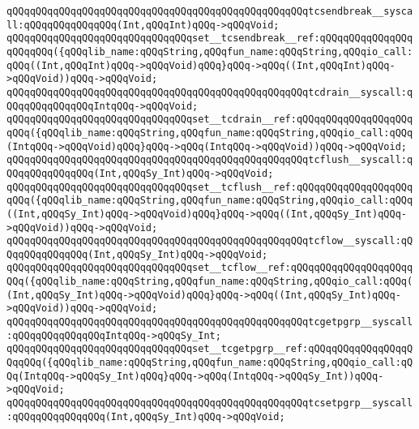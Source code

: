 \newline
\verb|qQQqqQQqqQQqqQQqqQQqqQQqqQQqqQQqqQQqqQQqqQQqqQQqqQQqtcsendbreak__syscall:qQQqqQQqqQQqqQQq(Int,qQQqInt)qQQq->qQQqVoid;|\newline
\verb|qQQqqQQqqQQqqQQqqQQqqQQqqQQqqQQqset__tcsendbreak__ref:qQQqqQQqqQQqqQQqqQQqqQQq({qQQqlib_name:qQQqString,qQQqfun_name:qQQqString,qQQqio_call:qQQq((Int,qQQqInt)qQQq->qQQqVoid)qQQq}qQQq->qQQq((Int,qQQqInt)qQQq->qQQqVoid))qQQq->qQQqVoid;|\newline
\newline
\verb|qQQqqQQqqQQqqQQqqQQqqQQqqQQqqQQqqQQqqQQqqQQqqQQqqQQqtcdrain__syscall:qQQqqQQqqQQqqQQqIntqQQq->qQQqVoid;|\newline
\verb|qQQqqQQqqQQqqQQqqQQqqQQqqQQqqQQqset__tcdrain__ref:qQQqqQQqqQQqqQQqqQQqqQQq({qQQqlib_name:qQQqString,qQQqfun_name:qQQqString,qQQqio_call:qQQq(IntqQQq->qQQqVoid)qQQq}qQQq->qQQq(IntqQQq->qQQqVoid))qQQq->qQQqVoid;|\newline
\newline
\verb|qQQqqQQqqQQqqQQqqQQqqQQqqQQqqQQqqQQqqQQqqQQqqQQqqQQqtcflush__syscall:qQQqqQQqqQQqqQQq(Int,qQQqSy_Int)qQQq->qQQqVoid;|\newline
\verb|qQQqqQQqqQQqqQQqqQQqqQQqqQQqqQQqset__tcflush__ref:qQQqqQQqqQQqqQQqqQQqqQQq({qQQqlib_name:qQQqString,qQQqfun_name:qQQqString,qQQqio_call:qQQq((Int,qQQqSy_Int)qQQq->qQQqVoid)qQQq}qQQq->qQQq((Int,qQQqSy_Int)qQQq->qQQqVoid))qQQq->qQQqVoid;|\newline
\newline
\verb|qQQqqQQqqQQqqQQqqQQqqQQqqQQqqQQqqQQqqQQqqQQqqQQqqQQqtcflow__syscall:qQQqqQQqqQQqqQQq(Int,qQQqSy_Int)qQQq->qQQqVoid;|\newline
\verb|qQQqqQQqqQQqqQQqqQQqqQQqqQQqqQQqset__tcflow__ref:qQQqqQQqqQQqqQQqqQQqqQQq({qQQqlib_name:qQQqString,qQQqfun_name:qQQqString,qQQqio_call:qQQq((Int,qQQqSy_Int)qQQq->qQQqVoid)qQQq}qQQq->qQQq((Int,qQQqSy_Int)qQQq->qQQqVoid))qQQq->qQQqVoid;|\newline
\newline
\verb|qQQqqQQqqQQqqQQqqQQqqQQqqQQqqQQqqQQqqQQqqQQqqQQqqQQqtcgetpgrp__syscall:qQQqqQQqqQQqqQQqIntqQQq->qQQqSy_Int;|\newline
\verb|qQQqqQQqqQQqqQQqqQQqqQQqqQQqqQQqset__tcgetpgrp__ref:qQQqqQQqqQQqqQQqqQQqqQQq({qQQqlib_name:qQQqString,qQQqfun_name:qQQqString,qQQqio_call:qQQq(IntqQQq->qQQqSy_Int)qQQq}qQQq->qQQq(IntqQQq->qQQqSy_Int))qQQq->qQQqVoid;|\newline
\newline
\verb|qQQqqQQqqQQqqQQqqQQqqQQqqQQqqQQqqQQqqQQqqQQqqQQqqQQqtcsetpgrp__syscall:qQQqqQQqqQQqqQQq(Int,qQQqSy_Int)qQQq->qQQqVoid;|\newline
